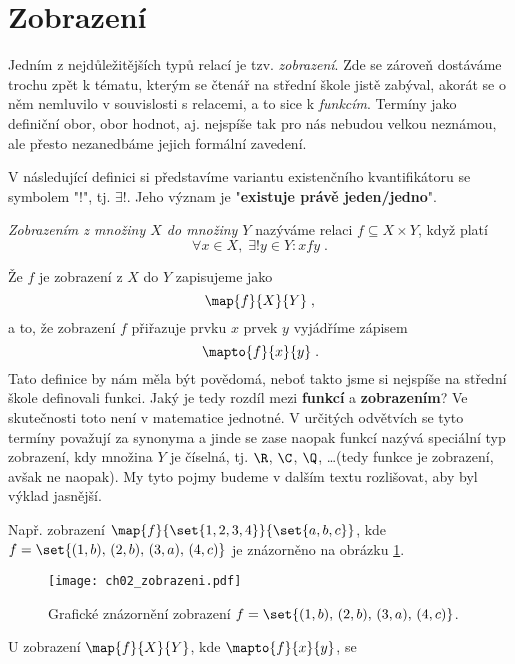 \section{Zobrazení}
Jedním z nejdůležitějších typů relací je tzv. \emph{zobrazení}. Zde se zároveň dostáváme trochu zpět k tématu, kterým se čtenář na střední škole jistě zabýval, akorát se o něm nemluvilo v souvislosti s relacemi, a to sice k \emph{funkcím}. Termíny jako definiční obor, obor hodnot, aj. nejspíše tak pro nás nebudou velkou neznámou, ale přesto nezanedbáme jejich formální zavedení.
\medskip

V následující definici si představíme variantu existenčního kvantifikátoru se symbolem "$!$", tj. $\exists!$. Jeho význam je "\textbf{existuje právě jeden/jedno}".
\begin{definition}[Zobrazení]\label{def:zobrazeni}
    \emph{Zobrazením z množiny $X$ do množiny $Y$} nazýváme relaci $f\subseteq X\times Y$, když platí
    \begin{equation*}
        \forall x\in X,\; \exists! y\in Y : xfy\; .
    \end{equation*}
\end{definition}
Že $f$ je zobrazení z $X$ do $Y$ zapisujeme jako
\begin{equation*}
    \map{f}{X}{Y}\; ,
\end{equation*}
a to, že zobrazení $f$ přiřazuje prvku $x$ prvek $y$ vyjádříme zápisem
\begin{equation*}
    \mapto{f}{x}{y}\; .
\end{equation*}
Tato definice by nám měla být povědomá, neboť takto jsme si nejspíše na střední škole definovali funkci. Jaký je tedy rozdíl mezi \textbf{funkcí} a \textbf{zobrazením}? Ve skutečnosti toto není v matematice jednotné. V určitých odvětvích se tyto termíny považují za synonyma a jinde se zase naopak funkcí nazývá speciální typ zobrazení, kdy množina $Y$ je číselná, tj. $\R$, $\C$, $\Q$, \dots (tedy funkce je zobrazení, avšak ne naopak). My tyto pojmy budeme v dalším textu rozlišovat, aby byl výklad jasnější.\par
Např. zobrazení $\map{f}{\set{1,2,3,4}}{\set{a,b,c}}$, kde $f=\set{(1,b),\,(2,b),\,(3,a),\,(4,c)}$ je znázorněno na obrázku \ref{fig:zobrazeni}.
\begin{figure}
    \centering
    \texttt{[image: ch02\_zobrazeni.pdf]}
    \caption{Grafické znázornění zobrazení $f=\set{(1,b),\,(2,b),\,(3,a),\,(4,c)}$.}
    \label{fig:zobrazeni}
\end{figure}
U zobrazení $\map{f}{X}{Y}$, kde $\mapto{f}{x}{y}$, se
